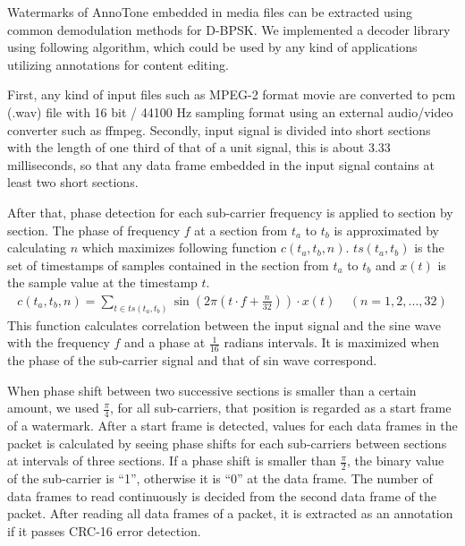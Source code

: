 Watermarks of AnnoTone embedded in media files can be extracted using common demodulation methods for D-BPSK. We implemented a decoder library using following algorithm, which could be used by any kind of applications utilizing annotations for content editing.

First, any kind of input files such as MPEG-2 format movie are converted to pcm (.wav) file with 16 bit / 44100 Hz sampling format using an external audio/video converter such as ffmpeg. %
Secondly, input signal is divided into short sections with the length of one third of that of a unit signal, this is about 3.33 milliseconds, so that any data frame embedded in the input signal contains at least two short sections.

After that, phase detection for each sub-carrier frequency is applied to section by section.
The phase of frequency $f$ at a section from $t_a$ to $t_b$ is approximated by calculating $n$ which maximizes following function $c(t_a, t_b, n)$.
$ts(t_a, t_b)$ is the set of timestamps of samples contained in the section from $t_a$ to $t_b$ and $x(t)$ is the sample value at the timestamp $t$.
\begin{align}
c(t_a, t_b, n) = \sum_{t \in ts(t_a, t_b)}
	\sin{( 2 \pi (t \cdot f + \frac{n}{32}))} \cdot x(t) \;\;\;\; (n = 1,2,...,32)
\end{align}
This function calculates correlation between the input signal and the sine wave with the frequency $f$ and a phase at $\frac{1}{16}$ radians intervals. It is maximized when the phase of the sub-carrier signal and that of sin wave correspond.

When phase shift between two successive sections is smaller than a certain amount, we used $\frac{\pi}{4}$, for all sub-carriers, that position is regarded as a start frame of a watermark.
After a start frame is detected, values for each data frames in the packet is calculated by seeing phase shifts for each sub-carriers between sections at intervals of three sections.
If a phase shift is smaller than $\frac{\pi}{2}$, the binary value of the sub-carrier is ``1'', otherwise it is ``0'' at the data frame.
The number of data frames to read continuously is decided from the second data frame of the packet.
After reading all data frames of a packet, it is extracted as an annotation if it passes CRC-16 error detection.
